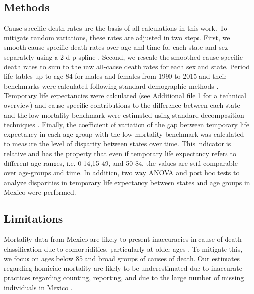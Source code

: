 \documentclass{bmcart}
\begin{document}
\subsection*{Methods}

Cause-specific death rates are the basis of all calculations in this work. To mitigate random variations, these rates are adjusted in two steps. First, we smooth cause-specific death rates over age and time for each state and sex separately using a 2-d p-spline \cite{GC2012}. Second, we rescale the smoothed cause-specific death rates to sum to the raw all-cause death rates for each sex and state. Period life tables up to
age 84 for males and females from 1990 to 2015 and their benchmarks were calculated following standard demographic methods \cite{HMDMP}. Temporary life expectancies were calculated \cite{arriaga1984} (see Additional file 1 for a technical overview) and  cause-specific contributions to the difference between
each state and the low mortality benchmark were estimated using
standard decomposition techniques \cite{horiuchi2008}. Finally, the coefficient of variation of the gap between temporary life expectancy in each age group with the low mortality benchmark was calculated to measure the level of disparity between states over time. This indicator is relative and has the property that even if temporary life expectancy refers to different age-ranges, i.e. 0-14,15-49, and 50-84, the values are still comparable over age-groups and time.  In addition, two way ANOVA and post hoc tests to analyze disparities in temporary life expectancy between states and age groups in Mexico were performed. 



\subsection*{Limitations}
Mortality data from Mexico are
likely to present inaccuracies in cause-of-death classification due to
comorbidities, particularly at older ages \cite{hernandez2011assessing}. To mitigate this,
we focus on ages below 85 and broad groups of causes of death.
Our estimates regarding homicide mortality are likely to be
underestimated due to inaccurate practices regarding counting, reporting,
and due to the large number of missing individuals in Mexico \cite{HRW2011}.
\end{document}
